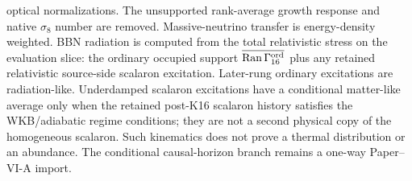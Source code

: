 \documentclass[12pt,a4paper]{article}
\begin{document}
optical normalizations.  The unsupported rank-average growth response and
native \(\sigma_8\) number are removed.  Massive-neutrino transfer is
energy-density weighted.  BBN radiation is computed from the total
relativistic stress on the evaluation slice: the ordinary occupied support
\(\overline{\operatorname{Ran}\Gamma_{16}^{\rm ord}}\) plus any retained
relativistic source-side scalaron excitation.  Later-rung ordinary excitations
are radiation-like.  Underdamped scalaron excitations have a conditional matter-like average only
when the retained post-K16 scalaron history satisfies the WKB/adiabatic regime
conditions; they are not a second physical copy of the homogeneous scalaron.
Such kinematics does not prove a thermal distribution or an abundance.  The conditional causal-horizon branch remains a one-way
Paper--VI-A import.
\end{document}
